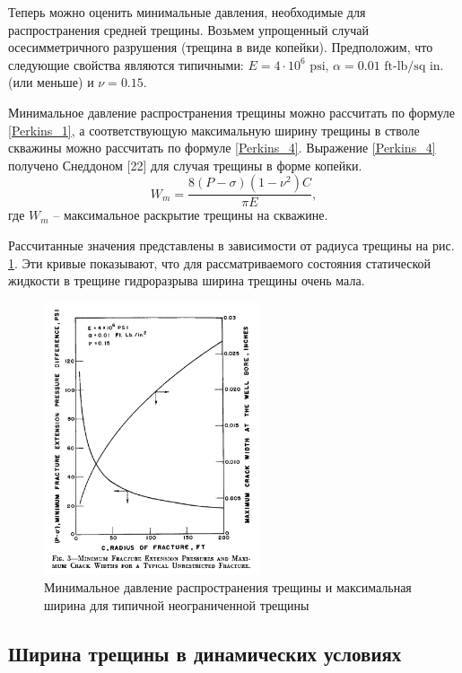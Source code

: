 \documentclass[a4paper, 12pt]{article}
\newcommand{\beq}{\begin{equation}}
\newcommand{\eeq}{\end{equation}}
\begin{document}
Теперь можно оценить минимальные давления, необходимые для распространения средней трещины.
Возьмем упрощенный случай осесимметричного разрушения (трещина в виде копейки).
Предположим, что следующие свойства являются типичными: $E=4\cdot10^6\text{ psi}$, $\alpha=0.01\text{ ft-lb/sq in.}$ (или меньше) и $\nu=0.15$.

Минимальное давление распространения трещины можно рассчитать по формуле \eqref{Perkins_1}, а соответствующую максимальную ширину трещины в стволе скважины можно рассчитать по формуле \eqref{Perkins_4}.
Выражение \eqref{Perkins_4} получено Снеддоном [22] для случая трещины в форме копейки.
\beq\label{Perkins_4}
W_m=\frac{8\left(P-\sigma\right)\left(1-\nu^2\right)C}{\pi E},
\tag{4}
\eeq
где $W_m$ -- максимальное раскрытие трещины на скважине.

Рассчитанные значения представлены в зависимости от радиуса трещины на рис. \ref{fig:Perkins3}.
Эти кривые показывают, что для рассматриваемого состояния статической жидкости в трещине гидроразрыва ширина трещины очень мала.

\begin{figure}[H]
\center
\includegraphics[width=0.57\textwidth]{Perkins_3}
\caption{Минимальное давление распространения трещины и максимальная ширина для типичной неограниченной трещины}
\label{fig:Perkins3}
\end{figure}

\subsection{Ширина трещины в динамических условиях}
\end{document}
